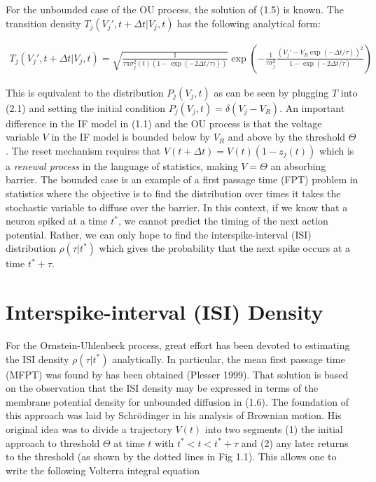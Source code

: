 \documentclass{ucetd}
\begin{document}
For the unbounded case of the OU process, the solution of (1.5) is known. The transition density $T_{j}(V_{j}',t+\Delta t|V_{j},t)$ has the following analytical form:

\begin{align}
T_{j}(V_{j}',t+\Delta t|V_{j},t) = \sqrt{\frac{1}{\tau\pi\sigma_{j}^{2}(t)(1-\exp\left(-2\Delta t/\tau)\right))}}\exp\left(-\frac{1}{\tau\sigma_{j}^{2}}\frac{(V_{j}'-V_{R}\exp(-\Delta t/\tau))^{2}}{1-\exp\left(-2\Delta t/\tau\right)}\right)
\end{align} 

This is equivalent to the distribution $P_{j}(V_{j},t)$ as can be seen by plugging $T$ into (2.1) and setting the initial condition $P_{j}(V_{j},t) = \delta(V_{j}-V_{R})$.  An important difference in the IF model in (1.1) and the OU process is that the voltage variable $V$ in the IF model is bounded below by $V_{R}$ and above by the threshold $\Theta$. The reset mechanism requires that $V(t+\Delta t) = V(t)(1-z_{j}(t))$ which is a \emph{renewal process} in the language of statistics, making $V = \Theta$ an absorbing barrier. The bounded case is an example of a first passage time (FPT) problem in statistics where the objective is to find the distribution over times it takes the stochastic variable to diffuse over the barrier. In this context, if we know that a neuron spiked at a time $t^{*}$, we cannot predict the timing of the next action potential. Rather, we can only hope to find the interspike-interval (ISI) distribution $\rho(\tau | t^{*})$ which gives the probability that the next spike occurs at a time $t^{*} + \tau$.  

\section{Interspike-interval (ISI) Density}

For the Ornstein-Uhlenbeck process, great effort has been devoted to estimating the ISI density $\rho(\tau | t^{*})$ analytically. In particular, the mean first passage time (MFPT) was found by has been obtained (Plesser 1999). That solution is based on the observation that the ISI density may be expressed in terms of the membrane potential density for unbounded diffusion in (1.6). The foundation of this approach was laid by Schr\"{o}dinger in his analysis of Brownian motion. His original idea was to divide a trajectory $V(t)$ into two segments (1) the initial approach to threshold $\Theta$ at time $t$ with $t^{*} < t < t^{*} + \tau$ and (2) any later returns to the threshold (as shown by the dotted lines in Fig 1.1). This allows one to write the following Volterra integral equation 
\end{document}
